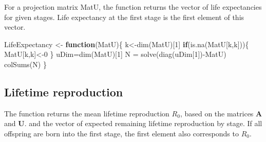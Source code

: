 \documentclass[
]{book}
\newenvironment{Shaded}{\begin{snugshade}}{\end{snugshade}}
\newcommand{\AttributeTok}[1]{\textcolor[rgb]{0.77,0.63,0.00}{#1}}
\newcommand{\ControlFlowTok}[1]{\textcolor[rgb]{0.13,0.29,0.53}{\textbf{#1}}}
\newcommand{\DecValTok}[1]{\textcolor[rgb]{0.00,0.00,0.81}{#1}}
\newcommand{\FunctionTok}[1]{\textcolor[rgb]{0.00,0.00,0.00}{#1}}
\newcommand{\NormalTok}[1]{#1}
\newcommand{\OtherTok}[1]{\textcolor[rgb]{0.56,0.35,0.01}{#1}}
\newcommand{\SpecialCharTok}[1]{\textcolor[rgb]{0.00,0.00,0.00}{#1}}
\newcommand{\StringTok}[1]{\textcolor[rgb]{0.31,0.60,0.02}{#1}}
\begin{document}
For a projection matrix MatU, the function returns the vector of life expectancies for given stages. Life expectancy at the first stage is the first element of this vector.

\begin{Shaded}
\begin{Highlighting}[]
\NormalTok{ LifeExpectancy }\OtherTok{\textless{}{-}} \ControlFlowTok{function}\NormalTok{(MatU)\{   }
\NormalTok{  k}\OtherTok{\textless{}{-}}\FunctionTok{dim}\NormalTok{(MatU)[}\DecValTok{1}\NormalTok{]}
  \ControlFlowTok{if}\NormalTok{(}\FunctionTok{is.na}\NormalTok{(MatU[k,k]))\{}
\NormalTok{    MatU[k,k]}\OtherTok{\textless{}{-}}\DecValTok{0}
\NormalTok{  \}}
\NormalTok{  uDim}\OtherTok{=}\FunctionTok{dim}\NormalTok{(MatU)[}\DecValTok{1}\NormalTok{]}
\NormalTok{  N }\OtherTok{=} \FunctionTok{solve}\NormalTok{(}\FunctionTok{diag}\NormalTok{(uDim[}\DecValTok{1}\NormalTok{])}\SpecialCharTok{{-}}\NormalTok{MatU)   }
  \FunctionTok{colSums}\NormalTok{(N)  }
\NormalTok{\}}
\end{Highlighting}
\end{Shaded}

\hypertarget{lifetime-reproduction}{%
\subsection{Lifetime reproduction}\label{lifetime-reproduction}}

The function returns the mean lifetime reproduction \(R_0\), based on the matrices \(\mathbf{A}\) and \(\mathbf{U}\). and the vector of expected remaining lifetime reproduction by stage. If all offspring are born into the first stage, the first element also corresponds to \(R_0\).

\begin{Shaded}
\end{Shaded}
\end{document}
